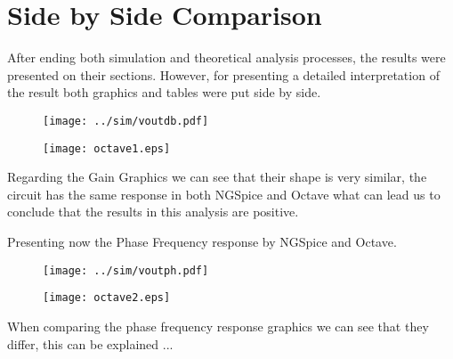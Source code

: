 \section{Side by Side Comparison}
\label{sec:comparison}

After ending both simulation and theoretical analysis processes, the results were presented on their sections. However, for presenting a detailed interpretation of the result both graphics and tables were put side by side.

\begin{figure} [ht]
\centering
\begin{minipage}{.5\textwidth}
  \centering
  \texttt{[image: ../sim/voutdb.pdf]}
  \label{fig:sim41}
\end{minipage}%
\begin{minipage}{.5\textwidth}
  \centering
  \texttt{[image: octave1.eps]}
  \label{fig:vout_env}
\end{minipage}
\end{figure}

\par Regarding the Gain Graphics we can see that their shape is very similar, the circuit has the same response in both NGSpice and Octave what can lead us to conclude that the results in this analysis are positive.

\par Presenting now the Phase Frequency response by NGSpice and Octave.
\begin{figure} [ht]
\centering
\begin{minipage}{.5\textwidth}
  \centering
  \texttt{[image: ../sim/voutph.pdf]}
  \label{fig:sim41}
\end{minipage}%
\begin{minipage}{.5\textwidth}
  \centering
  \texttt{[image: octave2.eps]}
  \label{fig:vout_env}
\end{minipage}
\end{figure}

When comparing the phase frequency response graphics we can see that they differ, this can be explained ...

%
%    
  
